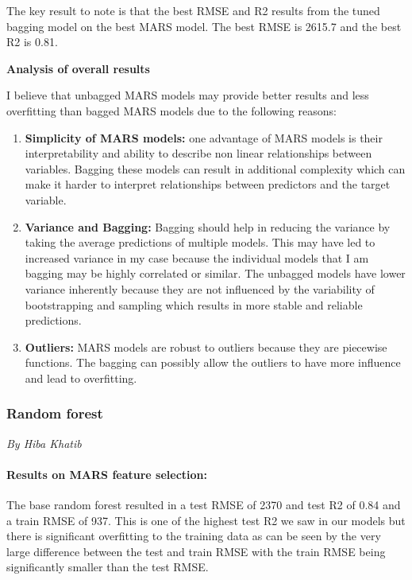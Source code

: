 \documentclass[
  letterpaper,
  DIV=11,
  numbers=noendperiod]{scrartcl}
\let\oldparagraph\paragraph
\renewcommand{\paragraph}[1]{\oldparagraph{#1}\mbox{}}
\providecommand{\tightlist}{%
  \setlength{\itemsep}{0pt}\setlength{\parskip}{0pt}}\usepackage{longtable,booktabs,array}
\begin{document}
The key result to note is that the best RMSE and R2 results from the
tuned bagging model on the best MARS model. The best RMSE is 2615.7 and
the best R2 is 0.81.

\textbf{Analysis of overall results}

I believe that unbagged MARS models may provide better results and less
overfitting than bagged MARS models due to the following reasons:

\begin{enumerate}
\def\labelenumi{\arabic{enumi}.}
\tightlist
\item
  \textbf{Simplicity of MARS models:} one advantage of MARS models is
  their interpretability and ability to describe non linear
  relationships between variables. Bagging these models can result in
  additional complexity which can make it harder to interpret
  relationships between predictors and the target variable.
\item
  \textbf{Variance and Bagging:} Bagging should help in reducing the
  variance by taking the average predictions of multiple models. This
  may have led to increased variance in my case because the individual
  models that I am bagging may be highly correlated or similar. The
  unbagged models have lower variance inherently because they are not
  influenced by the variability of bootstrapping and sampling which
  results in more stable and reliable predictions.
\item
  \textbf{Outliers:} MARS models are robust to outliers because they are
  piecewise functions. The bagging can possibly allow the outliers to
  have more influence and lead to overfitting.
\end{enumerate}

\hypertarget{random-forest}{%
\subsubsection{Random forest}\label{random-forest}}

\emph{By Hiba Khatib}

\hypertarget{results-on-mars-feature-selection}{%
\paragraph{Results on MARS feature
selection:}\label{results-on-mars-feature-selection}}

The base random forest resulted in a test RMSE of 2370 and test R2 of
0.84 and a train RMSE of 937. This is one of the highest test R2 we saw
in our models but there is significant overfitting to the training data
as can be seen by the very large difference between the test and train
RMSE with the train RMSE being significantly smaller than the test RMSE.
\end{document}
